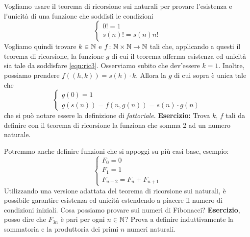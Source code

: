 Vogliamo usare il teorema di ricorsione sui naturali per provare l'esistenza e l'unicità di una funzione che soddisfi le condizioni
\begin{equation}
  \begin{cases}
    0! = 1 \\ s(n)! = s(n)n!
  \end{cases} \label{eqn:ric3}
\end{equation}
Vogliamo quindi trovare \(k \in \mathbb{N}\) e \(f \colon \mathbb{N} \times \mathbb{N} \to \mathbb{N}\) tali che, applicando a questi il teorema di ricorsione, la funzione \(g\) di cui il teorema afferma esistenza ed unicità sia tale da soddisfare \eqref{eqn:ric3}. Osserviamo subito che dev'essere \(k = 1\). Inoltre, possiamo prendere \(f((h,k)) = s(h)\cdot k\). Allora la \(g\) di cui sopra è unica tale che
\[
\begin{cases}
  g(0) = 1 \\ g(s(n)) = f(n, g(n)) = s(n)\cdot g(n)
\end{cases}
\]
che si può notare essere la definizione di \emph{fattoriale}.
{\bf Esercizio:} Trova \(k\), \(f\) tali da definire con il teorema di ricorsione la funziona che somma 2 ad un numero naturale.

Potremmo anche definire funzioni che si appoggi su più casi base, esempio:
\begin{equation}
  \begin{cases}
    F_0 = 0 \\ F_1 = 1 \\ F_{n+2} = F_n + F_{n+1}
  \end{cases}
\end{equation}
Utilizzando una versione adattata del teorema di ricorsione sui naturali, è possibile garantire esistenza ed unicità estendendo a piacere il numero di condizioni iniziali.
Cosa possiamo provare sui numeri di Fibonacci? {\bf Esercizio}, posso dire che \(F_{3n}\) è pari per ogni \(n \in \mathbb{N}\)? Prova a definire induttivamente la sommatoria e la produttoria dei primi \(n\) numeri naturali.
